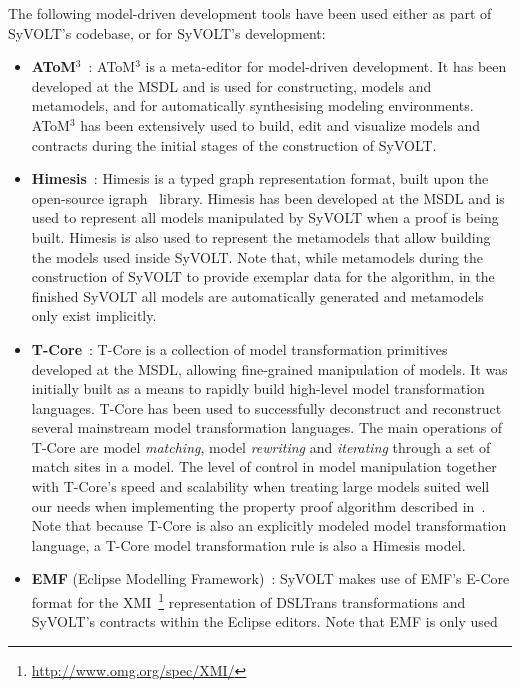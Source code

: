 The following model-driven development tools have been used either as part of
SyVOLT's codebase, or for SyVOLT's development:
\begin{itemize}
  \item \textbf{AToM$^3$}~\cite{}: AToM$^3$ is a meta-editor for model-driven
  development. It has been developed at the MSDL and is used for constructing,
  models and metamodels, and for automatically synthesising modeling
  environments.
  AToM$^3$ has been extensively used to build, edit and visualize models and
  contracts during the initial stages of the construction of SyVOLT.\\
  \item \textbf{Himesis}~\cite{}: Himesis is a typed graph representation
  format, built upon the open-source igraph~\cite{} library. Himesis has been
  developed at the MSDL and is used to represent all models manipulated by SyVOLT when a proof is being built.
  Himesis is also used to represent the metamodels that allow building the
  models used inside SyVOLT. Note that, while metamodels during the construction
  of SyVOLT to provide exemplar data for the algorithm, in the finished
  SyVOLT all models are automatically generated and metamodels only exist
  implicitly.\\
  \item \textbf{T-Core}~\cite{}: T-Core is a collection of model transformation
  primitives developed at the MSDL, allowing fine-grained manipulation of
  models. It was initially built as a means to rapidly build
  high-level model transformation languages. T-Core has been used to
  successfully deconstruct and reconstruct several mainstream model transformation
  languages. The main operations of T-Core are model \emph{matching}, model
  \emph{rewriting} and \emph{iterating} through a set of match sites in a model.
  The level of control in model manipulation together with T-Core's speed and
  scalability when treating large models suited well our needs when implementing
  the property proof algorithm described in~\cite{Lucio2014}. Note that because
  T-Core is also an explicitly modeled model transformation language, a T-Core
  model transformation rule is also a Himesis model.\\
  \item \textbf{EMF} (Eclipse Modelling Framework)~\cite{}: SyVOLT makes use of
  EMF's E-Core format for the XMI~\footnote{\url{http://www.omg.org/spec/XMI/}} representation of DSLTrans transformations
  and SyVOLT's contracts within the Eclipse editors. Note that EMF is only used

\end{itemize}
